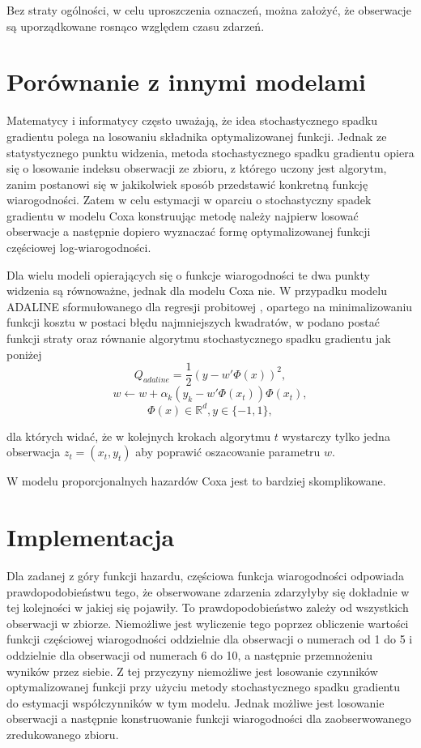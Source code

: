 Bez straty ogólności, w celu uproszczenia oznaczeń, można założyć, że obserwacje są uporządkowane rosnąco względem czasu zdarzeń.

\section{Porównanie z innymi modelami}

Matematycy i informatycy często uważają, że idea stochastycznego spadku gradientu polega na losowaniu składnika optymalizowanej funkcji. Jednak ze statystycznego punktu widzenia, metoda stochastycznego spadku gradientu opiera się o losowanie indeksu obserwacji ze zbioru, z którego uczony jest algorytm, zanim postanowi się w jakikolwiek sposób przedstawić konkretną funkcję wiarogodności. Zatem w celu estymacji w oparciu o stochastyczny spadek gradientu w modelu Coxa konstruując metodę należy najpierw losować obserwacje a następnie dopiero wyznaczać formę optymalizowanej funkcji częściowej log-wiarogodności.

Dla wielu modeli opierających się o funkcje wiarogodności te dwa punkty widzenia są równoważne, jednak dla modelu Coxa nie. W przypadku modelu ADALINE sformułowanego dla regresji probitowej \cite{ADALINE2}, opartego na minimalizowaniu funkcji kosztu w postaci błędu najmniejszych kwadratów, w \cite{bott2} podano postać funkcji straty oraz równanie algorytmu stochastycznego spadku gradientu jak poniżej
$$Q_{adaline} = \frac{1}{2}(y-w'\varPhi(x))^2,$$ 
$$w \leftarrow w + \alpha_k(y_k-w'\varPhi(x_t))\varPhi(x_t),$$
$$\varPhi(x) \in \mathbb{R}^d, y \in \{-1,1\},$$

dla których widać, że w kolejnych krokach algorytmu $t$ wystarczy tylko jedna obserwacja $z_t=(x_t,y_t)$ aby poprawić oszacowanie parametru $w$.

W modelu proporcjonalnych hazardów Coxa jest to bardziej skomplikowane.

\section{Implementacja}

Dla zadanej z góry funkcji hazardu, częściowa funkcja wiarogodności odpowiada prawdopodobieństwu tego, że obserwowane zdarzenia zdarzyłyby się dokładnie w tej kolejności w jakiej się pojawiły. To prawdopodobieństwo zależy od wszystkich obserwacji w zbiorze. Niemożliwe jest wyliczenie tego poprzez obliczenie wartości funkcji częściowej wiarogodności oddzielnie dla obserwacji o numerach od 1 do 5 i oddzielnie dla obserwacji od numerach 6 do 10, a następnie przemnożeniu wyników przez siebie. Z tej przyczyny niemożliwe jest losowanie czynników optymalizowanej funkcji przy użyciu metody stochastycznego spadku gradientu do estymacji współczynników w tym modelu. Jednak możliwe jest losowanie obserwacji a następnie konstruowanie funkcji wiarogodności dla zaobserwowanego zredukowanego zbioru.

